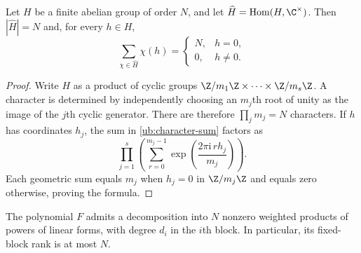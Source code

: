 \begin{lemma}
\label{ub:orthogonality}
Let $H$ be a finite abelian group of order $N$, and let
$\widehat H=\operatorname{Hom}(H,\C^\times)$. Then
$|\widehat H|=N$ and, for every $h\in H$,
\begin{equation}
 \sum_{\chi\in\widehat H}\chi(h)
 =\begin{cases}
     N,&h=0,\\
     0,&h\ne0.
   \end{cases}
 \label{ub:character-sum}
\end{equation}
\end{lemma}

\begin{proof}
Write $H$ as a product of cyclic groups
$\Z/m_1\Z\times\cdots\times\Z/m_s\Z$. A character is determined
by independently choosing an $m_j$th root of unity as the image of
the $j$th cyclic generator. There are therefore
$\prod_j m_j=N$ characters. If $h$ has coordinates $h_j$, the sum
in \eqref{ub:character-sum} factors as
\[
 \prod_{j=1}^s
 \left(\sum_{r=0}^{m_j-1}
       \exp\!\left(\frac{2\pi\mathrm{i}\,r h_j}{m_j}\right)\right).
\]
Each geometric sum equals $m_j$ when $h_j=0$ in $\Z/m_j\Z$ and
equals zero otherwise, proving the formula.
\end{proof}

\begin{proposition}
\label{prop:upper}
The polynomial $F$ admits a decomposition into $N$ nonzero weighted
products of powers of linear forms, with degree $d_i$ in the $i$th
block. In particular, its fixed-block rank is at most $N$.
\end{proposition}

